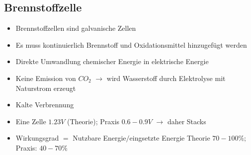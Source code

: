 \subsection{Brennstoffzelle}
\begin{itemize}
    \item Brennstoffzellen sind galvanische Zellen
    \item Es muss kontinuierlich Brennstoff und Oxidationsmittel hinzugefügt
        werden
    \item Direkte Umwandlung chemischer Energie in elektrische Energie
    \item Keine Emission von $CO_2$ $\rightarrow$ wird Wasserstoff durch
        Elektrolyse mit Naturstrom erzeugt
    \item Kalte Verbrennung
    \item Eine Zelle $1.23V$ (Theorie); Praxis $0.6 - 0.9V$ $\rightarrow$ daher
        Stacks
    \item Wirkungsgrad $=$ Nutzbare Energie$/$eingsetzte Energie Theorie $70-100\%$;
        Praxis: $40-70\%$
\end{itemize}
